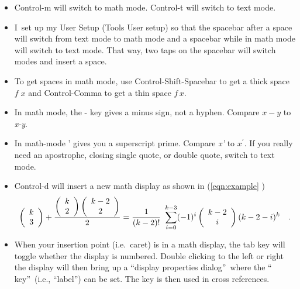 \begin{itemize}
\item Control-m will switch to math mode. Control-t will switch to text mode.

\item I\ set up my User Setup (Tools \TEXTsymbol{>}\TEXTsymbol{>} User
setup) so that the spacebar after a space will switch from text mode to math
mode and a spacebar while in math mode will switch to text mode. That way,
two taps on the spacebar will switch modes and insert a space.

\item To get spaces in math mode, use Control-Shift-Spacebar to get a thick
space $f\;x$ and Control-Comma to get a thin space $f\,x$.

\item In math mode, the - key gives a minus sign, not a hyphen. Compare $x-y$
to \textit{x-y}.

\item In math-mode ' gives you a superscript prime. Compare \textit{x'} to $%
x^{\prime }$. If you really need an apostrophe, closing single quote, or
double quote, switch to text mode.

\item Control-d will insert a new math display as shown in (\ref{eqn:example}%
) 
\begin{equation}
\left( 
\begin{array}{c}
k \\ 
3%
\end{array}%
\right) +\frac{\left( 
\begin{array}{c}
k \\ 
2%
\end{array}%
\right) \left( 
\begin{array}{c}
k-2 \\ 
2%
\end{array}%
\right) }{2}=\frac{1}{(k-2)!}\ \sum_{i=0}^{k-3}(-1)^{i}\left( 
\begin{array}{c}
k-2 \\ 
i%
\end{array}%
\right) (k-2-i)^{k}\text{\quad .}  \label{eqn:example}
\end{equation}

\item When your insertion point (i.e.~caret) is in a math display, the tab
key will toggle whether the display is numbered. Double clicking to the left
or right the display will then bring up a \textquotedblleft display
properties dialog\textquotedblright\ where the \textquotedblleft
key\textquotedblright\ (i.e., \textquotedblleft label\textquotedblright )
can be set. The key is then used in cross references.


\end{itemize}
